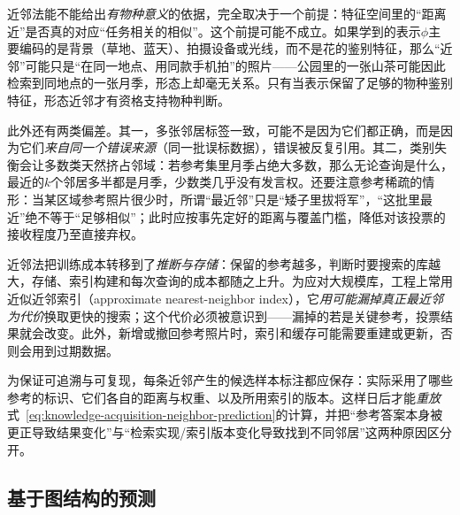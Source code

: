 近邻法能不能给出\emph{有物种意义}的依据，完全取决于一个前提：特征空间里的“距离近”是否真的对应“任务相关的相似”。这个前提可能不成立。如果学到的表示$\phi$主要编码的是背景（草地、蓝天）、拍摄设备或光线，而不是花的鉴别特征，那么“近邻”可能只是“在同一地点、用同款手机拍”的照片——公园里的一张山茶可能因此检索到同地点的一张月季，形态上却毫无关系。只有当表示保留了足够的物种鉴别特征，形态近邻才有资格支持物种判断。

此外还有两类偏差。其一，多张邻居标签一致，可能不是因为它们都正确，而是因为它们\emph{来自同一个错误来源}（同一批误标数据），错误被反复引用。其二，类别失衡会让多数类天然挤占邻域：若参考集里月季占绝大多数，那么无论查询是什么，最近的$k$个邻居多半都是月季，少数类几乎没有发言权。还要注意参考稀疏的情形：当某区域参考照片很少时，所谓“最近邻”只是“矮子里拔将军”，“这批里最近”绝不等于“足够相似”；此时应按事先定好的距离与覆盖门槛，降低对该投票的接收程度乃至直接弃权。

近邻法把训练成本转移到了\emph{推断与存储}：保留的参考越多，判断时要搜索的库越大，存储、索引构建和每次查询的成本都随之上升。为应对大规模库，工程上常用近似近邻索引（approximate nearest-neighbor index），它\emph{用可能漏掉真正最近邻为代价}换取更快的搜索；这个代价必须被意识到——漏掉的若是关键参考，投票结果就会改变。此外，新增或撤回参考照片时，索引和缓存可能需要重建或更新，否则会用到过期数据。

为保证可追溯与可复现，每条近邻产生的候选样本标注都应保存：实际采用了哪些参考的标识、它们各自的距离与权重、以及所用索引的版本。这样日后才能\emph{重放}式~\eqref{eq:knowledge-acquisition-neighbor-prediction}的计算，并把“参考答案本身被更正导致结果变化”与“检索实现/索引版本变化导致找到不同邻居”这两种原因区分开。

\subsection{基于图结构的预测}
\label{sec:knowledge-acquisition-graph-prediction}

